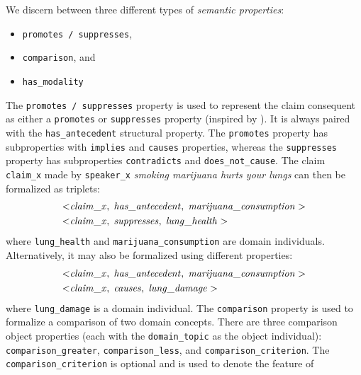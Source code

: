 We discern between three different types of \emph{semantic properties}:
\begin{itemize}
\item \texttt{promotes / suppresses},
\item \texttt{comparison}, and
\item \texttt{has\_modality}
\end{itemize}
The \texttt{promotes / suppresses} property is used to represent the claim
consequent as either a \texttt{promotes} or \texttt{suppresses} property
(inspired by \citet{hashimoto2012excitatory}). It is always paired with
the \texttt{has\_antecedent} structural property. The \texttt{promotes}
property has subproperties with \texttt{implies} and \texttt{causes}
properties, whereas the \texttt{suppresses} property has 
subproperties \texttt{contradicts} and \texttt{does\_not\_cause}.
The claim \texttt{claim\_x} made by \texttt{speaker\_x}
\emph{smoking marijuana hurts your lungs} can then be formalized as triplets:
\begin{align*}
	< & \mathit{claim\_x}, \hspace{0.1cm} \mathit{has\_antecedent}, \hspace{0.1cm}
	\mathit{marijuana\_consumption} > \\
	< & \mathit{claim\_x}, \hspace{0.1cm} \mathit{suppresses}, \hspace{0.1cm}
	\mathit{lung\_health} > 
\end{align*}
where \texttt{lung\_health} and \texttt{marijuana\_consumption} are 
domain individuals. 
Alternatively, it may also be formalized using different properties:
\begin{align*}
	< & \mathit{claim\_x}, \hspace{0.1cm} \mathit{has\_antecedent}, \hspace{0.1cm}
	\mathit{marijuana\_consumption} > \\
	< & \mathit{claim\_x}, \hspace{0.1cm} \mathit{causes}, \hspace{0.1cm}
	\mathit{lung\_damage} > 
\end{align*}
where \texttt{lung\_damage} is a domain individual. 
The \texttt{comparison} property is used to formalize a comparison of 
two domain concepts. There are three comparison object properties (each with the
\texttt{domain\_topic} as the object individual): \texttt{comparison\_greater},
\texttt{comparison\_less}, and \texttt{comparison\_criterion}. The
\texttt{comparison\_criterion} is optional and is used to denote the feature of 
